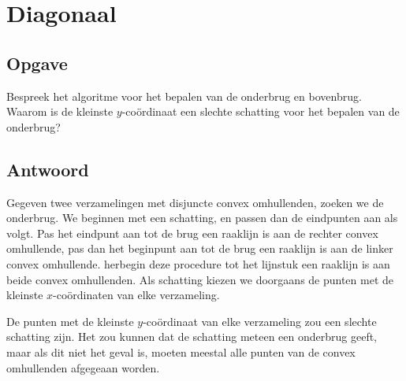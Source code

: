 \documentclass[examenvragen.tex]{subfiles}
\begin{document}
\section{Diagonaal}
\subsection{Opgave}
Bespreek het algoritme voor het bepalen van de onderbrug en bovenbrug. Waarom is de kleinste $y$-co\"ordinaat een slechte schatting voor het bepalen van de onderbrug?

\subsection{Antwoord}
Gegeven twee verzamelingen met disjuncte convex omhullenden, zoeken we de onderbrug. We beginnen met een schatting, en passen dan de eindpunten aan als volgt. Pas het eindpunt aan tot de brug een raaklijn is aan de rechter convex omhullende, pas dan het beginpunt aan tot de brug een raaklijn is aan de linker convex omhullende. herbegin deze procedure tot het lijnstuk een raaklijn is aan beide convex omhullenden. Als schatting kiezen we doorgaans de punten met de kleinste $x$-co\"ordinaten van elke verzameling.

De punten met de kleinste $y$-co\"ordinaat van elke verzameling zou een slechte schatting zijn. Het zou kunnen dat de schatting meteen een onderbrug geeft, maar als dit niet het geval is, moeten meestal alle punten van de convex omhullenden afgegeaan worden.
\end{document}

